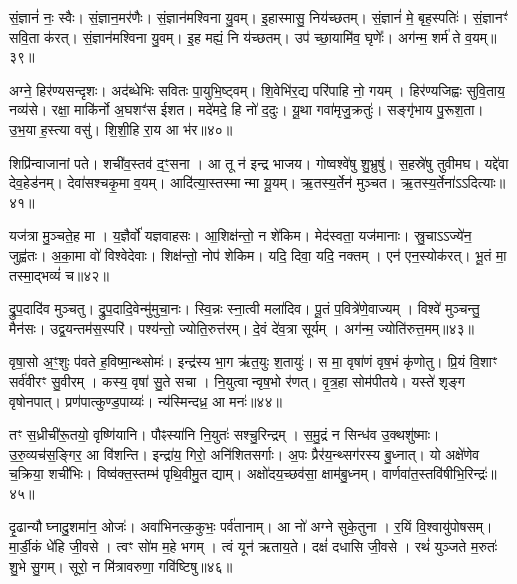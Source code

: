 सं॒ज्ञानं॑ नः॒ स्वैः।
सं॒ज्ञान॒मर॑णैः।
सं॒ज्ञान॑मश्विना यु॒वम्।
इ॒हास्मासु॒ निय॑च्छतम्।
सं॒ज्ञानं॑ मे॒ बृह॒स्पतिः॑।
सं॒ज्ञानꣳ॑ सवि॒ता क॑रत्।
सं॒ज्ञान॑मश्विना यु॒वम्।
इ॒ह मह्यं॒ नि य॑च्छतम्।
उप॑ च्छा॒यामि॑व॒ घृणेः᳚।
अग॑न्म॒ शर्म॑ ते व॒यम्॥३९॥

अग्ने॒ हिर॑ण्यसन्दृशः।
अद॑ब्धेभिः सवितः पा॒युभि॒ष्ट्वम्।
शि॒वेभि॑र॒द्य परि॑पाहि नो॒ गयम्।
हिर॑ण्यजिह्वः सुवि॒ताय॒ नव्य॑से।
रक्षा॒ माकि॑र्नो अ॒घशꣳ॑स ईशत।
मदे॑मदे॒ हि नो॑ द॒दुः।
यू॒था गवा॑मृजु॒क्रतुः॑।
सङ्गृ॑भाय पु॒रूश॒ता।
उ॒भ॒या ह॒स्त्या वसु॑।
शि॒शी॒हि रा॒य आ भ॑र॥४०॥

शिप्रि॑न्वाजानां पते।
शची॑व॒स्तव॑ द॒ꣳ॒सना।
आ तू न॑ इन्द्र भाजय।
गोष्वश्वे॑षु शु॒भ्रुषु॑।
स॒हस्रे॑षु तुवीमघ।
यद्दे॑वा देव॒हेड॑नम्।
देवा॑सश्चकृ॒मा व॒यम्।
आदि॑त्या॒स्तस्मान्मा यू॒यम्।
ऋ॒तस्य॒र्तेन॑ मुञ्चत।
ऋ॒तस्य॒र्तेना॑ऽऽदित्याः॥४१॥

यज॑त्रा मु॒ञ्चते॒ह मा।
य॒ज्ञैर्वो॑ यज्ञवाहसः।
आ॒शिक्ष॑न्तो॒ न शे॑किम।
मेद॑स्वता॒ यज॑मानाः।
स्रु॒चा\-ऽऽज्ये॑न॒ जुह्व॑तः।
अ॒का॒मा वो॑ विश्वेदेवाः।
शिक्ष॑न्तो॒ नोप॑ शेकिम।
यदि॒ दिवा॒ यदि॒ नक्तम्।
एन॑ एन॒स्योक॑रत्।
भू॒तं मा॒ तस्मा॒द्भव्यं॑ च॥४२॥

द्रु॒प॒दादि॑व मुञ्चतु।
द्रु॒प॒दादि॒वेन्मु॑मुचा॒नः।
स्वि॒न्नः स्ना॒त्वी मला॑दिव।
पू॒तं प॒वित्रे॑णे॒वाज्यम्।
विश्वे॑ मुञ्चन्तु॒ मैन॑सः।
उद्व॒यन्तम॑स॒स्परि॑।
पश्य॑न्तो॒ ज्योति॒रुत्त॑रम्।
दे॒वं दे॑व॒त्रा सूर्यम्।
अग॑न्म॒ ज्योति॑रुत्त॒मम्॥४३॥\anuvakamend[तव॑ कृधि॒ वन॒स्पतीञ्जानता॒मस॑ति व॒यं भ॑रादित्याश्च॒ नव॑ च]

वृषा॒सो अ॒ꣳ॒शुः प॑वते ह॒विष्मा॒न्थ्सोमः॑।
इन्द्र॑स्य भा॒ग ऋ॑त॒युः श॒तायुः॑।
स मा॒ वृषा॑णं वृष॒भं कृ॑णोतु।
प्रि॒यं वि॒शाꣳ सर्व॑वीरꣳ सु॒वीरम्।
कस्य॒ वृषा॑ सु॒ते सचा।
नि॒युत्वान्वृष॒भो र॑णत्।
वृ॒त्र॒हा सोम॑पीतये।
यस्ते॑ शृङ्ग वृषोनपात्।
प्रण॑पात्कुण्ड॒पाय्यः॑।
न्य॑स्मिन्दध्र॒ आ मनः॑॥४४॥

तꣳ स॒ध्रीची॑रू॒तयो॒ वृष्णि॑यानि।
पौꣴस्या॑नि नि॒युतः॑ सश्चु॒रिन्द्रम्।
स॒मु॒द्रं न सिन्ध॑व उ॒क्थशु॑ष्माः।
उ॒रु॒व्यच॑स॒ङ्गिर॒ आ वि॑शन्ति।
इन्द्रा॑य॒ गिरो॒ अनि॑शितसर्गाः।
अ॒पः प्रैर॑य॒न्थ्सग॑रस्य बु॒ध्नात्।
यो अक्षे॑णेव च॒क्रिया॒ शची॑भिः।
विष्व॑क्त॒स्तम्भ॑ पृथि॒वीमु॒त द्याम्।
अक्षो॑दय॒च्छव॑सा॒ क्षाम॑बु॒ध्नम्।
वार्णवा॑त॒स्तवि॑षीभि॒रिन्द्रः॑॥४५॥

दृ॒ढान्यौघ्नादु॒शमा॑न॒ ओजः॑।
अवा॑भिनत्क॒कुभः॒ पर्व॑तानाम्।
आ नो॑ अग्ने सुके॒तुना।
र॒यिं वि॒श्वायु॑पोषसम्।
मा॒र्डी॒कं धे॑हि जी॒वसे।
त्वꣳ सो॑म म॒हे भगम्।
त्वं यून॑ ऋताय॒ते।
दक्षं॑ दधासि जी॒वसे।
रथं॑ युञ्जते म॒रुतः॑ शु॒भे सु॒गम्।
सूरो॒ न मि॑त्रावरुणा॒ गवि॑ष्टिषु॥४६॥

